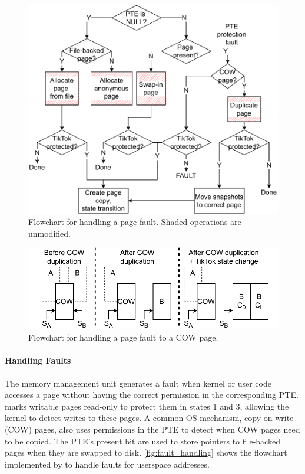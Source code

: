 \documentclass[letterpaper,twocolumn,10pt, anonymous]{article}
\begin{document}
\begin{figure}[h]
  \includegraphics[width=\linewidth]{img/pagefault.pdf}
  \caption{Flowchart for handling a page fault. Shaded 
          operations are unmodified.}
  \label{fig:fault_handling}
\end{figure}

\begin{figure}[h]
  \includegraphics[width=\linewidth]{img/pagefault_cow.pdf}
  \caption{Flowchart for handling a page fault to a COW page.}
  \label{fig:fault_handling_cow}
\end{figure}

\paragraph{Handling Faults}
The memory management unit generates a fault when kernel or user code accesses
a page without having the correct permission in the corresponding PTE.
\tiktok marks writable pages read-only to protect them in 
states 1 and 3, allowing the kernel to detect writes to these pages.
A common OS mechanism, copy-on-write (COW) pages, also uses 
permissions in the PTE to detect when COW pages need to be copied.
The PTE's present bit are used to store pointers to file-backed pages
when they are swapped to disk.
\autoref{fig:fault_handling} shows the flowchart implemented by
 to handle faults for userspace addresses.
\end{document}
